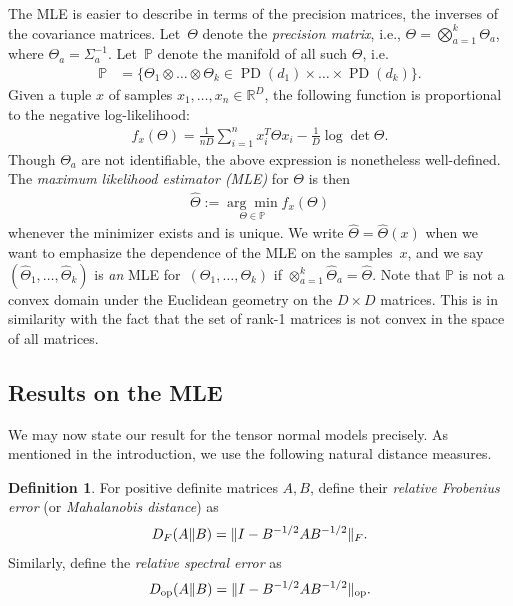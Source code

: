 \documentclass[aos]{imsart}
\theoremstyle{definition}
\newtheorem*{definition}{Definition}
\numberwithin{equation}{section}
\DeclareMathOperator{\op}{op}
\DeclareMathOperator{\PD}{PD}
\DeclarePairedDelimiter{\norm}{\lVert}{\rVert}
\newcommand{\R}{{\mathbb{R}}}
\renewcommand{\P}{{\mathbb{P}}}
\newcommand{\htheta}{\widehat{\Theta}}
\newcommand{\ot}{\otimes}
\newcommand{\samp}{x}
\newcommand{\ef}{f}
\begin{document}
The MLE is easier to describe in terms of the precision matrices, the inverses of the covariance matrices.
Let~$\Theta$ denote the \emph{precision matrix}, i.e., $\Theta = \bigotimes_{a=1}^k \Theta_a$, where $\Theta_a = \Sigma_a^{-1}$.
Let~$\P$ denote the manifold of all such $\Theta$, i.e.
\begin{align*}
  \P &= \{ \Theta_1 \ot \dots \ot \Theta_k \in \PD(d_1) \times \dots \times \PD(d_k) \}.
 \end{align*}
Given a tuple $x$ of samples $\samp_1,\dots,\samp_n\in\R^D$, the following function is proportional to the negative log-likelihood: %
\begin{align*}
  \ef_\samp(\Theta)
=  \frac{1}{nD}\sum_{i = 1}^n \samp_i^T \Theta \samp_i -  \frac{1}{D}\log\det\Theta.
\end{align*}
Though $\Theta_a$ are not identifiable, the above expression is nonetheless well-defined.
The \emph{maximum likelihood estimator (MLE)} for $\Theta$ is then
\begin{align}\label{eq:mle}
  \widehat{\Theta} := \underset{\Theta \in \P}{ \arg\min} f_x(\Theta)
\end{align}
whenever the minimizer exists and is unique.
We write $\widehat\Theta = \widehat\Theta(x)$ when we want to emphasize the dependence of the MLE on the samples~$x$, and we say $(\htheta_1, \dots, \htheta_k)$ is \emph{an} MLE for~$(\Theta_1, \dots, \Theta_k)$ if $\otimes_{a = 1}^k \htheta_a = \htheta$.
Note that $\P$ is not a convex domain under the Euclidean geometry on the $D\times D$ matrices.
This is in similarity with the fact that the set of rank-1 matrices is not convex in the space of all matrices.

\subsection{Results on the MLE}
We may now state our result for the tensor normal models precisely.
As mentioned in the introduction, we use the following natural distance measures.

\begin{definition}
For positive definite matrices $A, B$, define their \emph{relative Frobenius error} (or \emph{Mahalanobis distance}) as
\begin{align*}
  D_F(A \Vert B) = \norm{I - B^{-1/2} A B^{-1/2}}_F.
\end{align*}
Similarly, define the \emph{relative spectral error} as
\begin{align*}
  D_{\op}(A \Vert B) = \norm{I - B^{-1/2} A B^{-1/2}}_{\op}.
\end{align*}
\end{definition}
\end{document}
